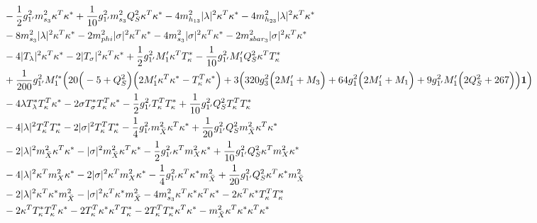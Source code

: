 {\begin{align}
 &-\frac{1}{2} g_{1'}^{2} m_{s_3}^2 {\kappa^{T}  \kappa^*} +\frac{1}{10} g_{1'}^{2} m_{s_3}^2 Q_{S}^{2} {\kappa^{T}  \kappa^*} -4 m_{h_{13}}^2 |\lambda|^2 {\kappa^{T}  \kappa^*} -4 m_{h_{23}}^2 |\lambda|^2 {\kappa^{T}  \kappa^*} \nonumber \\ 
 &-8 m_{s_3}^2 |\lambda|^2 {\kappa^{T}  \kappa^*} -2 m_{phi}^2 |\sigma|^2 {\kappa^{T}  \kappa^*} -4 m_{s_3}^2 |\sigma|^2 {\kappa^{T}  \kappa^*} -2 m_{sbar_3}^2 |\sigma|^2 {\kappa^{T}  \kappa^*} \nonumber \\ 
 &-4 |T_{\lambda}|^2 {\kappa^{T}  \kappa^*} -2 |T_{\sigma}|^2 {\kappa^{T}  \kappa^*} +\frac{1}{2} g_{1'}^{2} M_1' {\kappa^{T}  T_{\kappa}^*} -\frac{1}{10} g_{1'}^{2} M_1' Q_{S}^{2} {\kappa^{T}  T_{\kappa}^*} \nonumber \\ 
 &+\frac{1}{200} g_{1'}^{2} M_1'^* \Big(20 \Big(-5 + Q_{S}^{2}\Big)\Big(2 M_1' {\kappa^{T}  \kappa^*}  - {T_{\kappa}^{T}  \kappa^*} \Big) + 3 \Big(320 g_{3}^{2} \Big(2 M_1'  + M_3\Big) + 64 g_{1}^{2} \Big(2 M_1'  + M_1\Big) + 9 g_{1'}^{2} M_1' \Big(2 Q_{S}^{2}  + 267\Big)\Big){\bf 1} \Big)\nonumber \\ 
 &-4 \lambda T_{\lambda}^* {T_{\kappa}^{T}  \kappa^*} -2 \sigma T_{\sigma}^* {T_{\kappa}^{T}  \kappa^*} -\frac{1}{2} g_{1'}^{2} {T_{\kappa}^{T}  T_{\kappa}^*} +\frac{1}{10} g_{1'}^{2} Q_{S}^{2} {T_{\kappa}^{T}  T_{\kappa}^*} \nonumber \\ 
 &-4 |\lambda|^2 {T_{\kappa}^{T}  T_{\kappa}^*} -2 |\sigma|^2 {T_{\kappa}^{T}  T_{\kappa}^*} -\frac{1}{4} g_{1'}^{2} {m_{\bar{X}}^2  \kappa^{T}  \kappa^*} +\frac{1}{20} g_{1'}^{2} Q_{S}^{2} {m_{\bar{X}}^2  \kappa^{T}  \kappa^*} \nonumber \\ 
 &-2 |\lambda|^2 {m_{\bar{X}}^2  \kappa^{T}  \kappa^*} - |\sigma|^2 {m_{\bar{X}}^2  \kappa^{T}  \kappa^*} -\frac{1}{2} g_{1'}^{2} {\kappa^{T}  m_{X}^2  \kappa^*} +\frac{1}{10} g_{1'}^{2} Q_{S}^{2} {\kappa^{T}  m_{X}^2  \kappa^*} \nonumber \\ 
 &-4 |\lambda|^2 {\kappa^{T}  m_{X}^2  \kappa^*} -2 |\sigma|^2 {\kappa^{T}  m_{X}^2  \kappa^*} -\frac{1}{4} g_{1'}^{2} {\kappa^{T}  \kappa^*  m_{\bar{X}}^2} +\frac{1}{20} g_{1'}^{2} Q_{S}^{2} {\kappa^{T}  \kappa^*  m_{\bar{X}}^2} \nonumber \\ 
 &-2 |\lambda|^2 {\kappa^{T}  \kappa^*  m_{\bar{X}}^2} - |\sigma|^2 {\kappa^{T}  \kappa^*  m_{\bar{X}}^2} -4 m_{s_3}^2 {\kappa^{T}  \kappa^*  \kappa^{T}  \kappa^*} -2 {\kappa^{T}  \kappa^*  T_{\kappa}^{T}  T_{\kappa}^*} \nonumber \\ 
 &-2 {\kappa^{T}  T_{\kappa}^*  T_{\kappa}^{T}  \kappa^*} -2 {T_{\kappa}^{T}  \kappa^*  \kappa^{T}  T_{\kappa}^*} -2 {T_{\kappa}^{T}  T_{\kappa}^*  \kappa^{T}  \kappa^*} - {m_{\bar{X}}^2  \kappa^{T}  \kappa^*  \kappa^{T}  \kappa^*} \nonumber \\ 

\end{align}}
